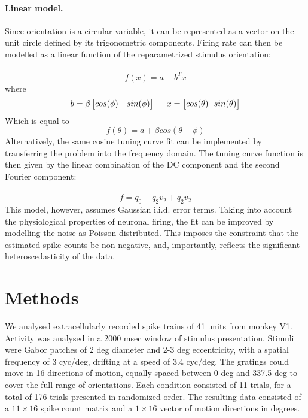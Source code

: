 \documentclass[10pt]{article}
\begin{document}
\paragraph{Linear model.} Since orientation is a circular variable, it can be represented as a vector on the unit circle defined by its trigonometric components. Firing rate can then be modelled as a linear function of the reparametrized stimulus orientation: \\ \\
\begin{equation*}
f(x) = a+b^Tx
\end{equation*}
where 
\begin{align*}
b = \beta \begin{bmatrix}
cos (\phi) & sin (\phi )
 \end{bmatrix}  
 \hspace{5mm}
 x =  \begin{bmatrix}
cos (\theta) \ \
  sin (\theta)
 \end{bmatrix} 
\end{align*}
Which is equal to 
\begin{equation*}
f(\theta) = a+ \beta cos(\theta - \phi)
\end{equation*}
Alternatively, the same cosine tuning curve fit can be implemented by transferring the problem into the frequency domain. The tuning curve function is then given by the linear combination of the DC component and the second Fourier component: \\ \\
\begin{equation*}
f = q_0+q_2v_2+ \bar{q_2}\bar{v_2}
\end{equation*}
This model, however, assumes Gaussian i.i.d. error terms. Taking into account the physiological properties of neuronal firing, the fit can be improved by modelling the noise as Poisson distributed. This imposes the constraint that the estimated spike counts be non-negative, and, importantly, reflects the significant heteroscedasticity of the data.


\section*{Methods}

We analysed extracellularly recorded spike trains of 41 units from monkey V1. Activity was analysed in a 2000 msec window of stimulus presentation. Stimuli were Gabor patches of 2 deg diameter and 2-3 deg eccentricity, with a spatial frequency of 3 cyc/deg, drifting at a speed of 3.4 cyc/deg. The gratings could move in 16 directions of motion, equally spaced between 0 deg and 337.5 deg to cover the full range of orientations. Each condition consisted of 11 trials, for a total of 176 trials presented in randomized order. The resulting data consisted of a $11\times16$ spike count matrix and a $1\times16$ vector of motion directions in degrees.\\
\end{document}
